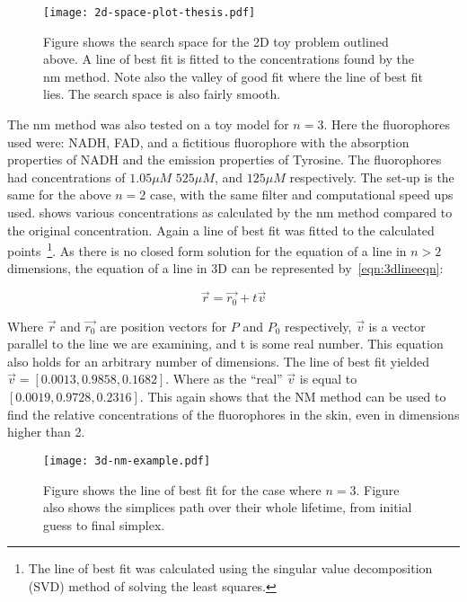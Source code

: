 \begin{figure}[!htpb]
  \centering
  \texttt{[image: 2d-space-plot-thesis.pdf]}
  \caption{Figure shows the search space for the 2D toy problem outlined above. A line of best fit is fitted to the concentrations found by the \gls*{nm} method. Note also the valley of good fit where the line of best fit lies. The search space is also fairly smooth.}
  \label{fig:spaceplot2D}
\end{figure}


The \gls*{nm} method was also tested on a toy model for $n=3$.
Here the fluorophores used were: NADH, FAD, and a fictitious fluorophore with the absorption properties of NADH and the emission properties of Tyrosine.
The fluorophores had concentrations of $1.05\mu M$ $525\mu M$, and $125\mu M$ respectively.
The set-up is the same for the above $n=2$ case, with the same filter and computational speed ups used.
 shows various concentrations as calculated by the \gls*{nm} method compared to the original concentration.
Again a line of best fit was fitted to the calculated points~\footnote{The line of best fit was calculated using the singular value decomposition (SVD) method of solving the least squares.}.
As there is no closed form solution for the equation of a line in $n>2$ dimensions, the equation of a line in 3D can be represented by~\cref{eqn:3dlineeqn}:

\begin{equation}
\overrightarrow{r}=\overrightarrow{r_0}+t\overrightarrow{v}
\label{eqn:3dlineeqn}
\end{equation}

Where $\overrightarrow{r}$ and $\overrightarrow{r_0}$ are position vectors for $P$ and $P_0$ respectively, $\overrightarrow{v}$ is a vector parallel to the line we are examining, and t is some real number.
This equation also holds for an arbitrary number of dimensions.
The line of best fit yielded $\overrightarrow{v} =\left[0.0013, 0.9858, 0.1682\right]$.
Where as the ``real'' $\overrightarrow{v}$ is equal to $\left[0.0019, 0.9728, 0.2316\right]$.
This again shows that the NM method can be used to find the relative concentrations of the fluorophores in the skin, even in dimensions higher than 2.

\begin{figure}[!htpb]
  \centering
  \texttt{[image: 3d-nm-example.pdf]}
  \caption{Figure shows the line of best fit for the case where $n=3$. Figure also shows the simplices path over their whole lifetime, from initial guess to final simplex.}
  \label{fig:3dtoymodel}
\end{figure}

